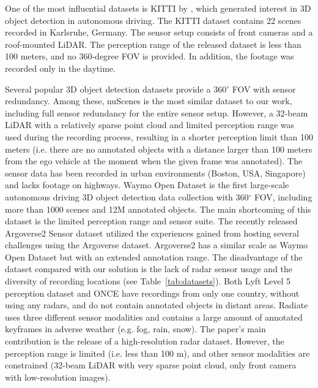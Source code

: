 \documentclass{article}
\begin{document}
One of the most influential datasets is KITTI by \citet{kitti}, which generated interest in 3D object detection in autonomous driving. The KITTI dataset contains 22 scenes recorded in Karlsruhe, Germany. The sensor setup consists of front cameras and a roof-mounted LiDAR. The perception range of the released dataset is less than 100 meters, and no 360-degree FOV is provided. In addition, the footage was recorded only in the daytime.

Several popular 3D object detection datasets provide a 360$^{\circ}$ FOV with sensor redundancy. Among these, nuScenes \citep{nuscenes} is the most similar dataset to our work, including full sensor redundancy for the entire sensor setup. However, a 32-beam LiDAR with a relatively sparse point cloud and limited perception range was used during the recording process, resulting in a shorter perception limit than 100 meters (i.e. there are no annotated objects with a distance larger than 100 meters from the ego vehicle at the moment when the given frame was annotated). The sensor data has been recorded in urban environments (Boston, USA, Singapore) and lacks footage on highways. Waymo Open Dataset\citep{waymo} is the first large-scale autonomous driving 3D object detection data collection with 360$^{\circ}$ FOV, including more than 1000 scenes and 12M annotated objects. The main shortcoming of this dataset is the limited perception range and sensor suite. The recently released Argoverse2 Sensor \citep{wilson2021argoverse} dataset utilized the experiences gained from hosting several challenges using the Argoverse \citep{argo} dataset. Argoverse2 has a similar scale as Waymo Open Dataset but with an extended annotation range. The disadvantage of the dataset compared with our solution is the lack of radar sensor usage and the diversity of recording locations (see Table~\ref{tab:datasets}). Both Lyft Level 5 perception dataset \citep{lyft} and ONCE \citep{mao2021one} have recordings from only one country, without using any radars, and do not contain annotated objects in distant areas. Radiate \citep{radiate} uses three different sensor modalities and contains a large amount of annotated keyframes in adverse weather (e.g. fog, rain, snow). The paper's main contribution is the release of a high-resolution radar dataset. However, the perception range is limited (i.e. less than 100 m), and other sensor modalities are constrained (32-beam LiDAR with very sparse point cloud, only front camera with low-resolution images).
\end{document}
